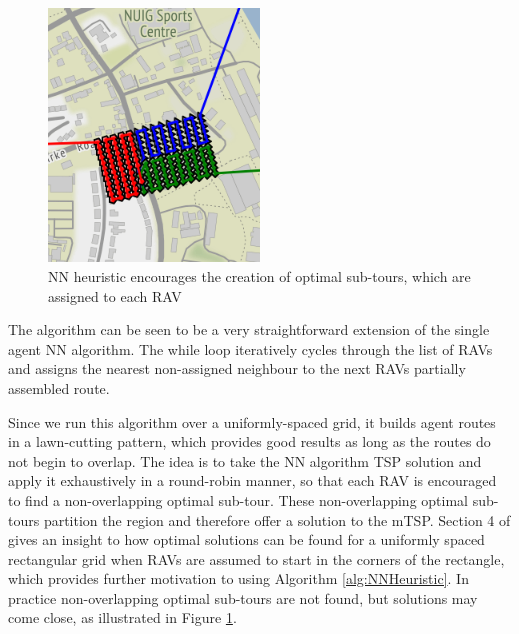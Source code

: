 \begin{figure}[h]
\centering
\includegraphics[width=0.5\textwidth]{Chapters/MultiAgentCoverage/Figs/RAVRoutingNUIGCropped.png}
\caption{NN heuristic encourages the creation of optimal sub-tours, which are assigned to each RAV}
\label{fig:NNPartitioning}
\end{figure}

The algorithm can be seen to be a very straightforward extension of the single agent NN algorithm. The while loop iteratively cycles through the list of RAVs and assigns the nearest non-assigned neighbour to the next RAVs partially assembled route.

Since we run this algorithm over a uniformly-spaced grid, it builds agent routes in a lawn-cutting pattern, which provides good results as long as the routes do not begin to overlap. The idea is to take the NN algorithm TSP solution and apply it exhaustively in a round-robin manner, so that each RAV is encouraged to find a non-overlapping optimal sub-tour. These non-overlapping optimal sub-tours partition the region and therefore offer a solution to the mTSP. Section 4 of \cite{Hungerlander2018TheGrids} gives an insight to how optimal solutions can be found for a uniformly spaced rectangular grid when RAVs are assumed to start in the corners of the rectangle, which provides further motivation to using Algorithm \ref{alg:NNHeuristic}. In practice non-overlapping optimal sub-tours are not found, but solutions may come close, as illustrated in Figure \ref{fig:NNPartitioning}.


